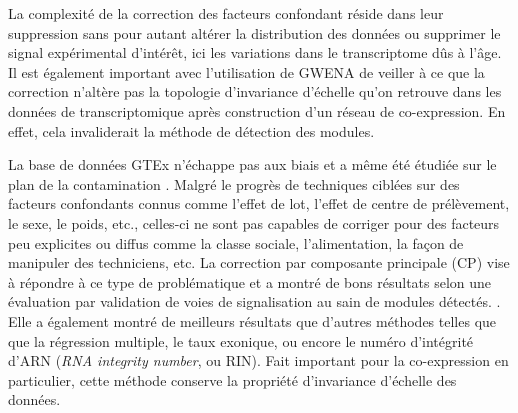 La complexité de la correction des facteurs confondant réside dans leur suppression sans pour autant altérer la distribution des données ou supprimer le signal expérimental d'intérêt, ici les variations dans le transcriptome dûs à l'âge. Il est également important avec l'utilisation de GWENA de veiller à ce que la correction n'altère pas la topologie d'invariance d'échelle qu'on retrouve dans les données de transcriptomique après construction d'un réseau de co-expression. En effet, cela invaliderait la méthode de détection des modules.


La base de données GTEx n'échappe pas aux biais et a même été étudiée sur le plan de la contamination .
Malgré le progrès de techniques ciblées sur des facteurs confondants connus comme l'effet de lot, l'effet de centre de prélèvement, le sexe, le poids, etc., celles-ci ne sont pas capables de corriger pour des facteurs peu explicites ou diffus comme la classe sociale, l'alimentation, la façon de manipuler des techniciens, etc. La correction par composante principale (CP) vise à répondre à ce type de problématique et a montré de bons résultats selon une évaluation par validation de voies de signalisation au sain de modules détectés. . Elle a également montré de meilleurs résultats que d'autres méthodes telles que que la régression multiple, le taux exonique, ou encore le numéro d'intégrité d'ARN (\textit{RNA integrity number}, ou RIN). Fait important pour la co-expression en particulier, cette méthode conserve la propriété d'invariance d'échelle des données.

